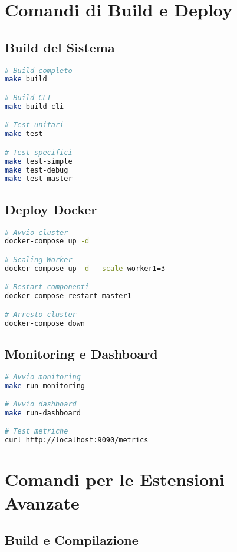 \documentclass[12pt,a4paper]{article}
\begin{document}
\section{Comandi di Build e Deploy}

\subsection{Build del Sistema}

\begin{lstlisting}[language=bash]
# Build completo
make build

# Build CLI
make build-cli

# Test unitari
make test

# Test specifici
make test-simple
make test-debug
make test-master
\end{lstlisting}

\subsection{Deploy Docker}

\begin{lstlisting}[language=bash]
# Avvio cluster
docker-compose up -d

# Scaling Worker
docker-compose up -d --scale worker1=3

# Restart componenti
docker-compose restart master1

# Arresto cluster
docker-compose down
\end{lstlisting}

\subsection{Monitoring e Dashboard}

\begin{lstlisting}[language=bash]
# Avvio monitoring
make run-monitoring

# Avvio dashboard
make run-dashboard

# Test metriche
curl http://localhost:9090/metrics
\end{lstlisting}

\section{Comandi per le Estensioni Avanzate}

\subsection{Build e Compilazione}
\end{document}
